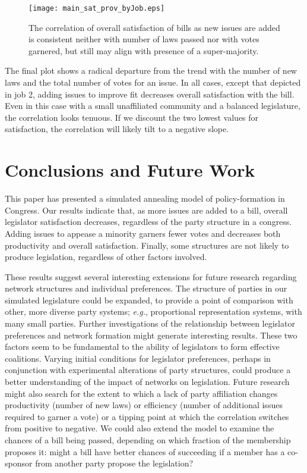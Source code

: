 \documentclass[pdftex,12pt]{llncs}
\begin{document}
\begin{figure}%
 \centering
  \texttt{[image: main\_sat\_prov\_byJob.eps]}
\caption[ ]{The correlation of overall satisfaction of bills as new issues are added is consistent neither with number of laws passed nor with votes garnered, but still may align with presence of a super-majority.}
 \label{satisfaction}
\end{figure}

The final plot shows a radical departure from the trend with the number of new laws and the total number of votes for an issue. 
In all cases, except that depicted in job 2, adding issues to improve fit decreases overall satisfaction with the bill. 
Even in this case with a small unaffiliated community and a balanced legislature, the correlation looks tenuous. 
If we discount the two lowest values for satisfaction, the correlation will likely tilt to a negative slope. 


\section{Conclusions and Future Work}
This paper has presented a simulated annealing model of policy-formation in Congress. 
Our results indicate that, as more issues are added to a bill, overall legislator satisfaction decreases, regardless of the party structure in a congress. 
Adding issues to appease a minority garners fewer votes and decreases both productivity and overall satisfaction. 
Finally, some structures are not likely to produce legislation, regardless of other factors involved. 

These results suggest several interesting extensions for future research regarding network structures and individual preferences. 
The structure of parties in our simulated legislature could be expanded, to provide a point of comparison with other, more diverse party systems; \textit{e.g.}, proportional representation systems, with many small parties.  
Further investigations of the relationship between legislator preferences and network formation might generate interesting results. 
These two factors seem to be fundamental to the ability of legislators to form effective coalitions.
Varying initial conditions for legislator preferences, perhaps in conjunction with experimental alterations of party structures, could produce a better understanding of the impact of networks on legislation.
Future research might also search for the extent to which a lack of party affiliation changes productivity (number of new laws) or efficiency (number of additional issues required to garner a vote) or a tipping point at which the correlation switches from positive to negative.
We could also extend the model to examine the chances of a bill being passed, depending on which fraction of the membership proposes it: might a bill have better chances of succeeding if a member has a co-sponsor from another party propose the legislation?
\end{document}
